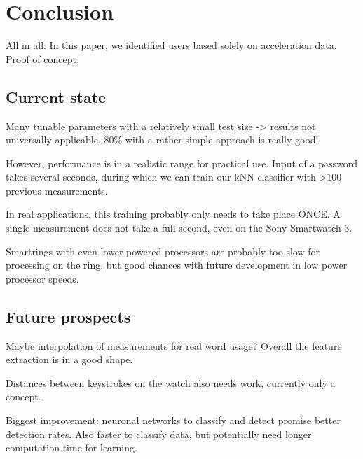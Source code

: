 \chapter{Conclusion}\label{chapter:conclusion}

All in all: In this paper, we identified users based solely on acceleration data. Proof of concept, 

\section{Current state}

Many tunable parameters with a relatively small test size -> results not universally applicable. 80\% with a rather simple approach is really good!

However, performance is in a realistic range for practical use. Input of a password takes several seconds, during which we can train our kNN classifier with >100 previous measurements.

In real applications, this training probably only needs to take place ONCE. A single measurement does not take a full second, even on the Sony Smartwatch 3.

Smartrings with even lower powered processors are probably too slow for processing on the ring, but good chances with future development in low power processor speeds.

\section{Future prospects}

Maybe interpolation of measurements for real word usage? Overall the feature extraction is in a good shape.

Distances between keystrokes on the watch also needs work, currently only a concept.

Biggest improvement: neuronal networks to classify and detect promise better detection rates. Also faster to classify data, but potentially need longer computation time for learning.
